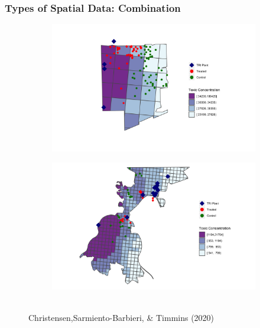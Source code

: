 \documentclass[
  shownotes,
  xcolor={svgnames},
  hyperref={colorlinks,citecolor=DarkBlue,linkcolor=DarkRed,urlcolor=DarkBlue}
   , aspectratio=169]{beamer}
\begin{document}
\begin{frame}[fragile]
\frametitle{Types of Spatial Data: Combination}

\begin{figure}[H] \centering
  \centering
  
\begin{subfigure}{0.45\linewidth}
\includegraphics[scale=0.08]{figures/ZIP_A.png}
\end{subfigure}
\begin{subfigure}{0.45\linewidth}
\includegraphics[scale=0.08]{figures/ZIP_B.png}

\end{subfigure}
  \\
  \tiny Christensen,Sarmiento-Barbieri,  \& Timmins (2020)
\end{figure}


\end{frame}
\end{document}
